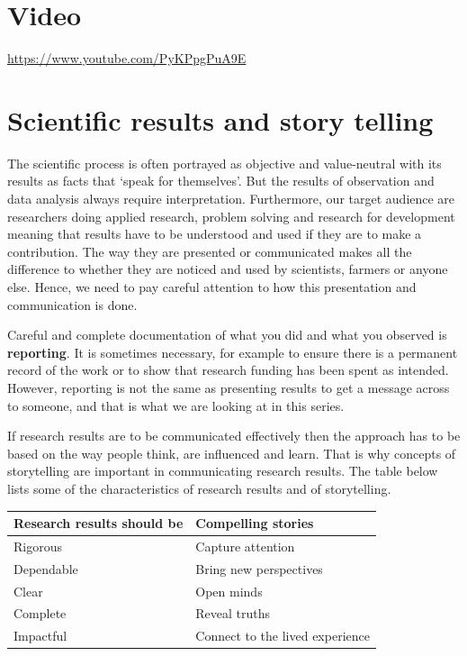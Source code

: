 \documentclass[
  titlepage]{book}
\begin{document}
\hypertarget{video}{%
\section{Video}\label{video}}

\label{fig:unnamed-chunk-3}\url{https://www.youtube.com/PyKPpgPuA9E}

\hypertarget{scientific-results-and-story-telling}{%
\section{Scientific results and story telling}\label{scientific-results-and-story-telling}}

The scientific process is often portrayed as objective and value-neutral with its results as facts that `speak for themselves'. But the results of observation and data analysis always require interpretation. Furthermore, our target audience are researchers doing applied research, problem solving and research for development meaning that results have to be understood and used if they are to make a contribution. The way they are presented or communicated makes all the difference to whether they are noticed and used by scientists, farmers or anyone else. Hence, we need to pay careful attention to how this presentation and communication is done.

Careful and complete documentation of what you did and what you observed is \textbf{reporting}. It is sometimes necessary, for example to ensure there is a permanent record of the work or to show that research funding has been spent as intended. However, reporting is not the same as presenting results to get a message across to someone, and that is what we are looking at in this series.

If research results are to be communicated effectively then the approach has to be based on the way people think, are influenced and learn. That is why concepts of storytelling are important in communicating research results. The table below lists some of the characteristics of research results and of storytelling.

\begin{longtable}[]{@{}ll@{}}
\toprule
Research results should be & Compelling stories \\
\midrule
\endhead
Rigorous & Capture attention \\
Dependable & Bring new perspectives \\
Clear & Open minds \\
Complete & Reveal truths \\
Impactful & Connect to the lived experience \\
\bottomrule
\end{longtable}
\end{document}
